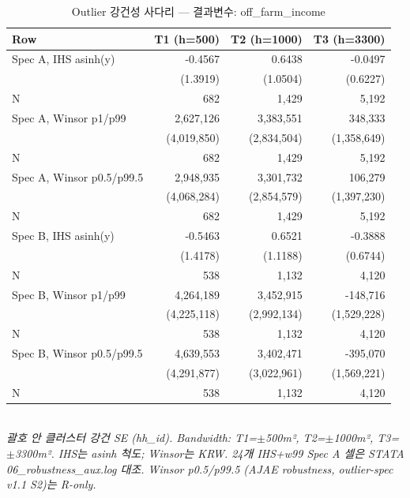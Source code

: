 \begin{table}[t]
\centering
\caption{Outlier 강건성 사다리 — 결과변수: off\_farm\_income}
\label{tab:rob_outlier_off_farm_income_ko}
\begin{tabular}{lrrr}
\toprule
Row & T1 (h=500) & T2 (h=1000) & T3 (h=3300) \\
\midrule
Spec A, IHS asinh(y) & -0.4567 & 0.6438 & -0.0497 \\
        & (1.3919) & (1.0504) & (0.6227) \\
N       & 682 & 1,429 & 5,192 \\
Spec A, Winsor p1/p99 & 2,627,126 & 3,383,551 & 348,333 \\
        & (4,019,850) & (2,834,504) & (1,358,649) \\
N       & 682 & 1,429 & 5,192 \\
Spec A, Winsor p0.5/p99.5 & 2,948,935 & 3,301,732 & 106,279 \\
        & (4,068,284) & (2,854,579) & (1,397,230) \\
N       & 682 & 1,429 & 5,192 \\
Spec B, IHS asinh(y) & -0.5463 & 0.6521 & -0.3888 \\
        & (1.4178) & (1.1188) & (0.6744) \\
N       & 538 & 1,132 & 4,120 \\
Spec B, Winsor p1/p99 & 4,264,189 & 3,452,915 & -148,716 \\
        & (4,225,118) & (2,992,134) & (1,529,228) \\
N       & 538 & 1,132 & 4,120 \\
Spec B, Winsor p0.5/p99.5 & 4,639,553 & 3,402,471 & -395,070 \\
        & (4,291,877) & (3,022,961) & (1,569,221) \\
N       & 538 & 1,132 & 4,120 \\
\bottomrule
\end{tabular}
\\
\footnotesize\textit{괄호 안 클러스터 강건 SE (hh\_id). Bandwidth: T1=$\pm$500m², T2=$\pm$1000m², T3=$\pm$3300m². IHS는 asinh 척도; Winsor는 KRW. 24개 IHS+w99 Spec A 셀은 STATA 06\_robustness\_aux.log 대조. Winsor p0.5/p99.5 (AJAE robustness, outlier-spec v1.1 S2)는 R-only.}
\end{table}


